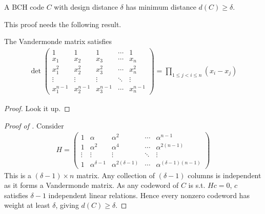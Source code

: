 \begin{theorem} \label{thm:14.3}
    A BCH code $C$ with design distance $\delta$ has minimum distance $d(C) \geq \delta$.
\end{theorem}

This proof needs the following result.

\begin{lemma}
    The Vandermonde matrix satisfies
    \begin{align*}
        \det \begin{pmatrix}
            1 & 1 & 1 & \cdots & 1 \\
            x_1 & x_2 & x_3 & \cdots & x_n \\
            x_1^2 & x_2^2 & x_3^2 & \cdots & x_n^2 \\
            \vdots & \vdots & \vdots & \ddots & \vdots \\
            x_1^{n-1} & x_2^{n-1} & x_3^{n-1} & \cdots & x_n^{n-1}
        \end{pmatrix} = \prod_{1 \leq j < i \leq n} (x_i - x_j)
    \end{align*}
\end{lemma}

\begin{proof}
    Look it up.
\end{proof}

\begin{proof}[Proof of ]
    Consider
    \begin{align*}
        H = \begin{pmatrix}
            1 & \alpha & \alpha^2 & \cdots & \alpha^{n-1} \\
            1 & \alpha^2 & \alpha^4 & \cdots & \alpha^{2(n-1)} \\
            \vdots & \vdots & \vdots & \ddots & \vdots \\
            1 & \alpha^{\delta - 1} & \alpha^{2(\delta - 1)} & \cdots & \alpha^{(\delta - 1)(n-1)}
        \end{pmatrix}
    \end{align*}
    This is a $(\delta - 1) \times n$ matrix.
    Any collection of $(\delta - 1)$ columns is independent as it forms a Vandermonde matrix.
    As any codeword of $C$ is s.t. $Hc = 0$, $c$ satisfies $\delta - 1$ independent linear relations.
    Hence every nonzero codeword has weight at least $\delta$, giving $d(C) \geq \delta$.
\end{proof}

